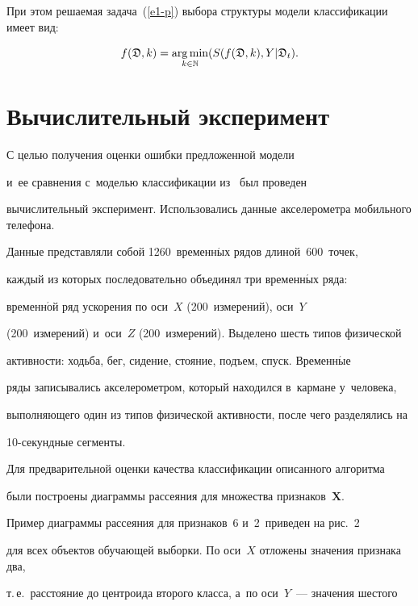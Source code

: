 При этом решаемая задача~(\ref{e1-p}) выбора структуры модели классификации имеет вид:

 \begin{equation*}

f(\fD,k) = \mathop{\arg\min}\limits_{{k\in\mathbb{N}}}(S(f(\fD,k),Y|\fD_t).

\end{equation*}



\section{Вычислительный эксперимент}



С целью получения оценки ошибки предложенной модели 

и~ее сравнения с~моделью классификации из~\cite{Popova2015} был проведен 

вычислительный эксперимент. Использовались данные акселерометра мобильного телефона. 

Данные представляли собой 1260~временн$\acute{\mbox{ы}}$х рядов длиной~600~точек, 

каждый из которых последовательно объединял три временн$\acute{\mbox{ы}}$х ряда: 

временн$\acute{\mbox{о}}$й ряд ускорения по оси~$X$ (200~измерений), оси~$Y$ 

(200~измерений) и~оси~$Z$ (200~измерений). Выделено шесть типов физической 

активности: ходьба, бег, сидение, стояние, подъем, спуск. Временн$\acute{\mbox{ы}}$е 

ряды записывались акселерометром, который находился в~кармане у~человека, 

выполняющего один из типов физической активности, после чего разделялись на 

10-се\-кунд\-ные сегменты.



Для предварительной оценки качества классификации описанного алгоритма 

были построены диаграммы рассеяния для множества признаков~$\mathbf{X}$. 

Пример диаграммы рассеяния для признаков~6 и~2~приведен на рис.~2 

для всех объектов обучающей выборки. По оси~$X$ отложены значения признака два, 

т.\,е.\ расстояние до центроида второго класса, а~по оси~$Y$~--- значения шестого 

